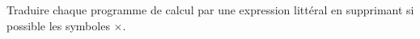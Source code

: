 \documentclass[exercice]{thedocument}%
\begin{document}
%
Traduire chaque programme de calcul par une expression littéral
en supprimant si possible les symboles $\times$.\par\bigskip
{}\par\medskip
{}\par\medskip
{}\par\medskip
{}
\end{document}
